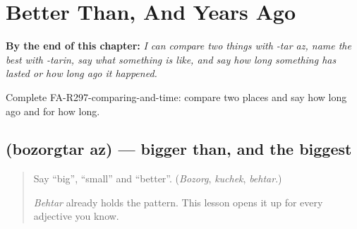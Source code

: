 
\chapter{Better Than, And Years Ago}
\label{ch:fa-better-than-and-years-ago}

\begin{chapteropening}
\textbf{By the end of this chapter:} \emph{I can compare two things with -tar az, name the best with -tarin, say what something is like, and say how long something has lasted or how long ago it happened.}

Complete FA-R297-comparing-and-time: compare two places and say how long ago and for how long.
\end{chapteropening}

\section[\texorpdfstring{\fa{بزرگتر} \fa{از} (bozorgtar az)}{بزرگتر از (bozorgtar az)}]{  (bozorgtar az) — bigger than, and the biggest}

\label{lesson:FA-C297-bozorgtar}



\begin{quote}
Say \textquotedblleft{}big\textquotedblright{}, \textquotedblleft{}small\textquotedblright{} and \textquotedblleft{}better\textquotedblright{}. (\emph{Bozorg}, \emph{kuchek}, \emph{behtar}.)

\emph{Behtar} already holds the pattern. This lesson opens it up for every adjective you know.
\end{quote}


